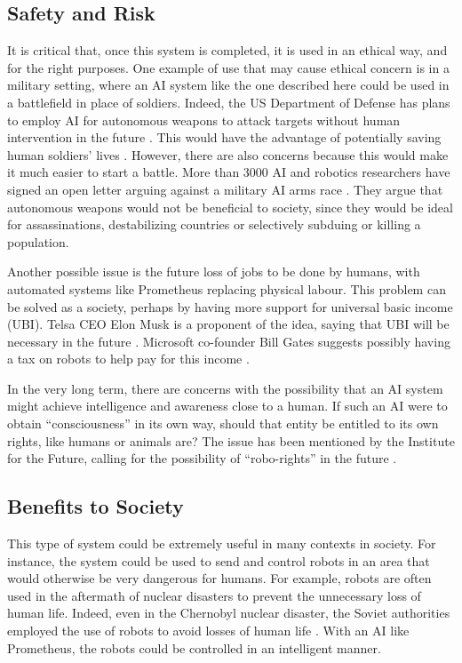 \documentclass[titlepage,11pt]{article}
\begin{document}
\subsection{Safety and Risk}

It is critical that, once this system is completed, it is used in an ethical way, and for the right purposes. One example of use that may cause ethical concern is in a military setting, where an AI system like the one described here could be used in a battlefield in place of soldiers. Indeed, the US Department of Defense has plans to employ AI for autonomous weapons to attack targets without human intervention in the future \cite{military}. This would have the advantage of potentially saving human soldiers' lives \cite{define_military_ai}. However, there are also concerns because this would make it much easier to start a battle. More than 3000 AI and robotics researchers have signed an open letter arguing against a military AI arms race \cite{openletter}. They argue that autonomous weapons would not be beneficial to society, since they would be ideal for assassinations, destabilizing countries or selectively subduing or killing a population.

Another possible issue is the future loss of jobs to be done by humans, with automated systems like Prometheus replacing physical labour. This problem can be solved as a society, perhaps by having more support for universal basic income (UBI). Telsa CEO Elon Musk is a proponent of the idea, saying that UBI will be necessary in the future \cite{musk}. Microsoft co-founder Bill Gates suggests possibly having a tax on robots to help pay for this income \cite{gates}.

In the very long term, there are concerns with the possibility that an AI system might achieve intelligence and awareness close to a human. If such an AI were to obtain ``consciousness'' in its own way, should that entity be entitled to its own rights, like humans or animals are? The issue has been mentioned by the Institute for the Future, calling for the possibility of ``robo-rights'' in the future \cite{robo_rights}.


\subsection{Benefits to Society}

This type of system could be extremely useful in many contexts in society. For instance, the system could be used to send and control robots in an area that would otherwise be very dangerous for humans. For example, robots are often used in the aftermath of nuclear disasters to prevent the unnecessary loss of human life. Indeed, even in the Chernobyl nuclear disaster, the Soviet authorities employed the use of robots to avoid losses of human life \cite{chernobyl}. With an AI like Prometheus, the robots could be controlled in an intelligent manner.
\end{document}
